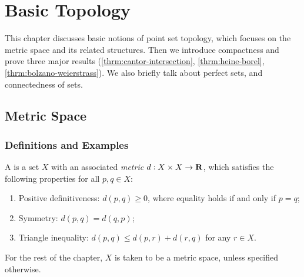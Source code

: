 \chapter{Basic Topology}\label{chap:basic-topology}
This chapter discusses basic notions of point set topology, which focuses on the metric space and its related structures. Then we introduce compactness and prove three major results (\cref{thrm:cantor-intersection}, \cref{thrm:heine-borel}, \cref{thrm:bolzano-weierstrass}). We also briefly talk about perfect sets, and connectedness of sets.

\section{Metric Space}
\subsection{Definitions and Examples}
\begin{definition}
A  is a set $X$ with an associated \emph{metric} $d:X\times X\to\mathbf R$, which satisfies the following properties for all $p,q\in X$:
\begin{enumerate}[label=(\roman*)]
\item Positive definitiveness: $d(p,q)\ge0$, where equality holds if and only if $p=q$;
\item Symmetry: $d(p,q)=d(q,p)$;
\item Triangle inequality: $d(p,q)\le d(p,r)+d(r,q)$ for any $r\in X$.
\end{enumerate}
\end{definition}

For the rest of the chapter, $X$ is taken to be a metric space, unless specified otherwise.

